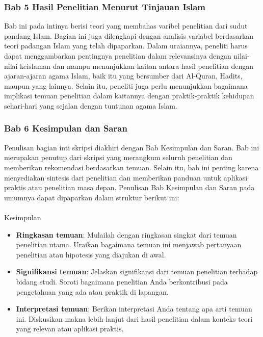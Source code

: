 \documentclass[
  indonesian,
  letterpaper,
]{scrbook}
\makeatletter
\let\oldparagraph\paragraph
\renewcommand{\paragraph}{
    \@ifstar
      \xxxParagraphStar
      \xxxParagraphNoStar
  }
\newcommand{\xxxParagraphStar}[1]{\oldparagraph*{#1}\mbox{}}
\newcommand{\xxxParagraphNoStar}[1]{\oldparagraph{#1}\mbox{}}
\providecommand{\tightlist}{%
  \setlength{\itemsep}{0pt}\setlength{\parskip}{0pt}}
\makeatother
\begin{document}
\subsubsection{Bab 5 Hasil Penelitian Menurut Tinjauan
Islam}\label{bab-5-hasil-penelitian-menurut-tinjauan-islam}

Bab ini pada intinya berisi teori yang membahas varibel penelitian dari
sudut pandang Islam. Bagian ini juga dilengkapi dengan analisis variabel
berdasarkan teori padangan Islam yang telah dipaparkan. Dalam uraiannya,
peneliti harus dapat menggambarkan pentingnya penelitian dalam
relevansinya dengan nilai-nilai keislaman dan mampu menunjukkan kaitan
antara hasil penelitian dengan ajaran-ajaran agama Islam, baik itu yang
bersumber dari Al-Quran, Hadits, maupun yang lainnya. Selain itu,
peneliti juga perlu menunjukkan bagaimana implikasi temuan penelitian
dalam kaitannya dengan praktik-praktik kehidupan sehari-hari yang
sejalan dengan tuntunan agama Islam.

\subsubsection{Bab 6 Kesimpulan dan
Saran}\label{bab-6-kesimpulan-dan-saran}

Penulisan bagian inti skripsi diakhiri dengan Bab Kesimpulan dan Saran.
Bab ini merupakan penutup dari skripsi yang merangkum seluruh penelitian
dan memberikan rekomendasi berdasarkan temuan. Selain itu, bab ini
penting karena menyediakan sintesis dari penelitian dan memberikan
panduan untuk aplikasi praktis atau penelitian masa depan. Penulisan Bab
Kesimpulan dan Saran pada umumnya dapat dipaparkan dalam struktur
berikut ini:

\paragraph{Kesimpulan}\label{kesimpulan-3}

\begin{itemize}
\tightlist
\item
  \textbf{Ringkasan temuan}: Mulailah dengan ringkasan singkat dari
  temuan penelitian utama. Uraikan bagaimana temuan ini menjawab
  pertanyaan penelitian atau hipotesis yang diajukan di awal.
\item
  \textbf{Signifikansi temuan}: Jelaskan signifikansi dari temuan
  penelitian terhadap bidang studi. Soroti bagaimana penelitian Anda
  berkontribusi pada pengetahuan yang ada atau praktik di lapangan.
\item
  \textbf{Interpretasi temuan}: Berikan interpretasi Anda tentang apa
  arti temuan ini. Diskusikan makna lebih lanjut dari hasil penelitian
  dalam konteks teori yang relevan atau aplikasi praktis.
\end{itemize}
\end{document}
